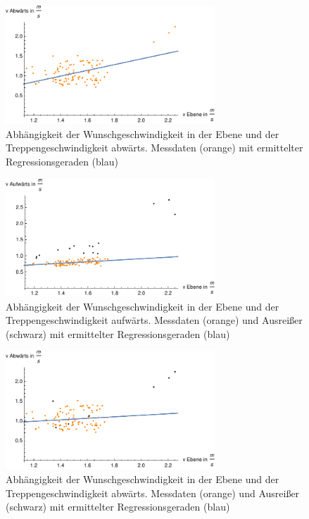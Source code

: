 \begin{figure}[htpb]
	\centering
	\includegraphics[width=0.7\textwidth]{abbildungen/regression/2012_2017_verbund/ab-ebene.pdf}
	
	\caption{Abhängigkeit der Wunschgeschwindigkeit in der Ebene und der Treppengeschwindigkeit abwärts. Messdaten (orange) mit ermittelter Regressionsgeraden (blau)}
	\label{fig:2012_und_2017_MA_ab_ebene}
\end{figure}

\begin{figure}[htpb]
	\centering
	\includegraphics[width=0.7\textwidth]{abbildungen/regression/2012_2017_verbund/ohneausreisser/auf-ebene.pdf}
	
	\caption{Abhängigkeit der Wunschgeschwindigkeit in der Ebene und der Treppengeschwindigkeit aufwärts. Messdaten (orange) und Ausreißer (schwarz) mit ermittelter Regressionsgeraden (blau)}
	\label{fig:2012_und_2017_OA_auf_ebene}
\end{figure}

\begin{figure}[htpb]
	\centering
	\includegraphics[width=0.7\textwidth]{abbildungen/regression/2012_2017_verbund/ohneausreisser/ab-ebene.pdf}
	
	\caption{Abhängigkeit der Wunschgeschwindigkeit in der Ebene und der Treppengeschwindigkeit abwärts. Messdaten (orange) und Ausreißer (schwarz) mit ermittelter Regressionsgeraden (blau)}
	\label{fig:2012_und_2017_OA_ab_ebene}
\end{figure}

